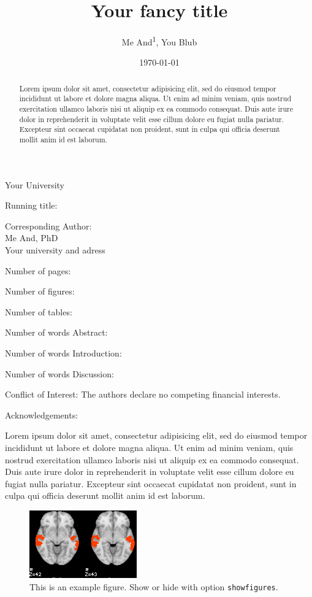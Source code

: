 \documentclass[10pt, %
showfigures %
]{jneurosci}
\title{Your fancy title}
\date{\normalsize\today}
\author{Me And\textsuperscript{1}, You Blub}
\newcommand{\loremipsum}{Lorem ipsum dolor sit amet, consectetur adipisicing elit, sed do eiusmod tempor incididunt ut labore et dolore magna aliqua. Ut enim ad minim veniam, quis nostrud exercitation ullamco laboris nisi ut aliquip ex ea commodo consequat. Duis aute irure dolor in reprehenderit in voluptate velit esse cillum dolore eu fugiat nulla pariatur. Excepteur sint occaecat cupidatat non proident, sunt in culpa qui officia deserunt mollit anim id est laborum.}
\begin{document}
\maketitle
\begin{affiliations}
\item Your University
\end{affiliations}

\begin{frontpage}

  \item[Running title:]
  \item[Corresponding Author:] ~\\
Me And, PhD\\
Your university and adress\\
\item[Number of pages:]
\item[Number of figures:]
\item[Number of tables:]
\item[Number of words Abstract:]
\item[Number of words Introduction:]
\item[Number of words Discussion:]
\item[Conflict of Interest:] The authors declare no competing financial interests.
\item[Acknowledgements:]
\end{frontpage}

\begin{abstract}
\loremipsum
\end{abstract}


\begin{introduction}
\loremipsum
\begin{figure}
  \begin{center}
    \includegraphics[width=.5\textwidth]{examplefig}
  \end{center}
  \caption{This is an example figure. Show or hide with option \texttt{showfigures}.}
\end{figure}

\nocite{*}
\end{introduction}
\end{document}
